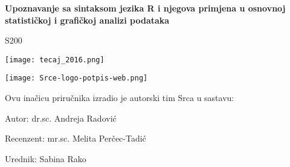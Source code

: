 \pagestyle{empty}

\begin{flushright}

\vspace{3 cm}

\Huge

{\bf Upoznavanje sa sintaksom jezika R i njegova primjena u osnovnoj statističkoj i grafičkoj analizi podataka}

\Large S200

\end{flushright}



\begin{centering}
\texttt{[image: tecaj\_2016.png]}\\[\bigskipamount]

\end{centering}

\vspace{3 cm}


\begin{flushright}

\vspace{2 cm}
  \texttt{[image: Srce-logo-potpis-web.png]}\\[\bigskipamount]

\end{flushright}

\newpage


\pagestyle{empty}

\begin{flushleft}

\normalsize Ovu inačicu priručnika izradio je autorski tim Srca u sastavu:

\normalsize Autor: dr.sc. Andreja Radović

\normalsize Recenzent: mr.sc. Melita Perčec-Tadić

\normalsize Urednik: Sabina Rako

\end{flushleft}


\vspace{3 cm}

